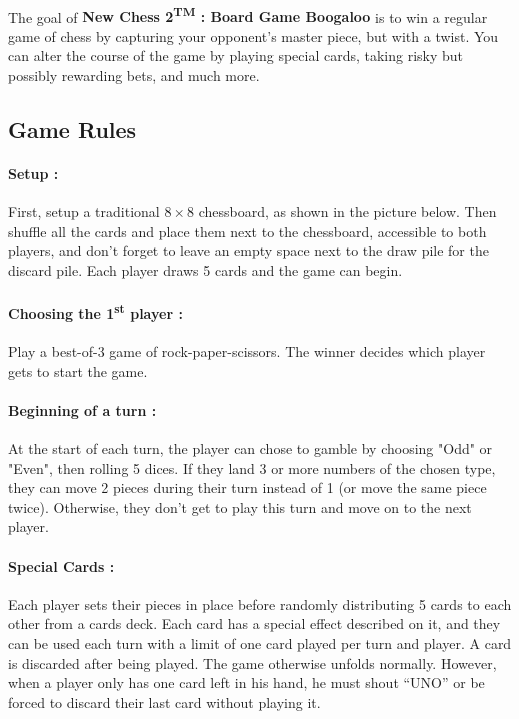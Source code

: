 \documentclass[12pt]{article}
\begin{document}
            \paragraph{}
                The goal of \textbf{New Chess 2\textsuperscript{TM} : Board Game Boogaloo} is to win a regular game of chess by capturing your opponent's master piece, but with a twist. You can alter the course of the game by playing special cards, taking risky but possibly rewarding bets, and much more.
                
                
        \subsection{Game Rules}
            \paragraph{Setup :\\}
                First, setup a traditional $8\times8$ chessboard, as shown in the picture below. Then shuffle all the cards and place them next to the chessboard, accessible to both players, and don't forget to leave an empty space next to the draw pile for the discard pile. Each player draws 5 cards and the game can begin.
                
            \paragraph{Choosing the 1\textsuperscript{st} player :\\}
                Play a best-of-3 game of rock-paper-scissors. The winner decides which player gets to start the game.
                
            \paragraph{Beginning of a turn :\\}
                At the start of each turn, the player can chose to gamble by choosing "Odd" or "Even", then rolling 5 dices. If they land 3 or more numbers of the chosen type, they can move 2 pieces during their turn instead of 1 (or move the same piece twice). Otherwise, they don't get to play this turn and move on to the next player.
            
            \paragraph{Special Cards :\\}
            Each player sets their pieces in place before randomly distributing 5 cards to each other from a cards deck. Each card has a special effect described on it, and they can be used each turn with a limit of one card played per turn and player. A card is discarded after being played.
            The game otherwise unfolds normally. However, when a player only has one card left in his hand, he must shout “UNO” or be forced to discard their last card without playing it.
            
\end{document}
